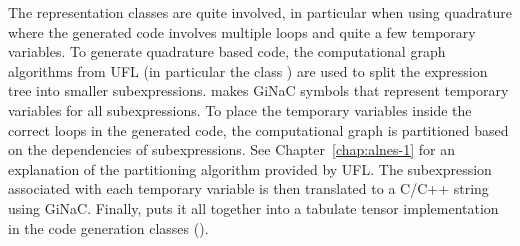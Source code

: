 The representation classes are quite involved, in particular when
using quadrature where the generated code involves multiple loops and
quite a few temporary variables. To generate quadrature based code,
the computational graph algorithms from UFL (in particular the class
) are used to split the expression tree into smaller
subexpressions.  \sfc{} makes GiNaC symbols that represent temporary
variables for all subexpressions.  To place the temporary variables
inside the correct loops in the generated code, the computational
graph is partitioned based on the dependencies of subexpressions. See
Chapter~\ref{chap:alnes-1} for an explanation of the partitioning
algorithm provided by UFL. The subexpression associated with
each temporary variable is then translated to a C/C++ string using
GiNaC. Finally, \sfc{} puts it all together into a tabulate tensor
implementation in the code generation classes ().

\endgroup 